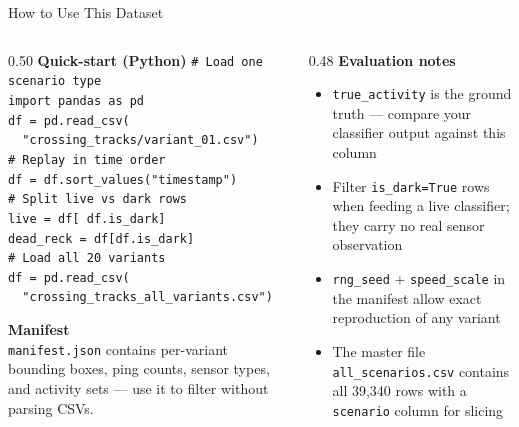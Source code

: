 \documentclass[aspectratio=169,11pt]{beamer}
\begin{document}
\begin{frame}{How to Use This Dataset}

  \begin{columns}[T]
    \begin{column}{0.50\textwidth}
      \textbf{Quick-start (Python)}
      \vspace{4pt}
      \small
      \texttt{\# Load one scenario type} \\
      \texttt{import pandas as pd} \\
      \texttt{df = pd.read\_csv(} \\
      \texttt{\ \ "crossing\_tracks/variant\_01.csv")} \\[6pt]
      \texttt{\# Replay in time order} \\
      \texttt{df = df.sort\_values("timestamp")} \\[6pt]
      \texttt{\# Split live vs dark rows} \\
      \texttt{live = df[~df.is\_dark]} \\
      \texttt{dead\_reck = df[df.is\_dark]} \\[6pt]
      \texttt{\# Load all 20 variants} \\
      \texttt{df = pd.read\_csv(} \\
      \texttt{\ \ "crossing\_tracks\_all\_variants.csv")}

      \vspace{8pt}
      \normalsize
      \textbf{Manifest} \\
      \texttt{manifest.json} contains per-variant bounding boxes,
      ping counts, sensor types, and activity sets — use it to
      filter without parsing CSVs.
    \end{column}
    \begin{column}{0.48\textwidth}
      \textbf{Evaluation notes}
      \begin{itemize}
        \item \texttt{true\_activity} is the ground truth — compare your
              classifier output against this column
        \item Filter \texttt{is\_dark=True} rows when feeding a live
              classifier; they carry no real sensor observation
        \item \texttt{rng\_seed} + \texttt{speed\_scale} in the manifest
              allow exact reproduction of any variant
        \item The master file \texttt{all\_scenarios.csv} contains all
              39,340 rows with a \texttt{scenario} column for slicing
      \end{itemize}


\end{column}
\end{columns}
\end{frame}
\end{document}
